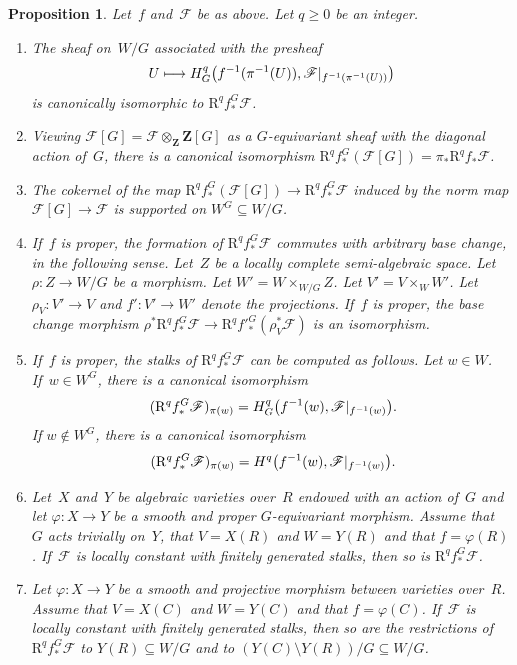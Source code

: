 \documentclass[JEP,XML,SOM,Unicode]{cedram}
\newcommand\mto{\mathchoice{\longmapsto}{\mapsto}{\mapsto}{\mapsto}}
\theoremstyle{plain}
\newtheorem{prop}[thm]{Proposition}
\theoremstyle{definition}
\numberwithin{equation}{section}
\newcommand{\sF}{{\mathscr F}}
\newcommand{\Z}{{\mathbf Z}}
\renewcommand{\phi}{\varphi}
\newcommand{\RR}{{\mathrm{R}}}
\begin{document}
\begin{prop}
\label{prop:joli leray general properties}
Let~$f$ and~$\sF$ be as above. Let $q\geq 0$ be an integer.
\begin{enumerate}
\item\label{prop:joli}
The sheaf on~$W/G$ associated with the presheaf
\[
U \mto H^q_G\big(f^{-1}(\pi^{-1}(U)),\sF|_{f^{-1}(\pi^{-1}(U))}\big)
\]
is canonically isomorphic to $\RR^qf^G_*\sF$.

\item\label{prop:jolii}
Viewing $\sF[G]=\sF \otimes_\Z \Z[G]$ as a $G$\nobreakdash-equivariant sheaf
with the diagonal action of~$G$, there is a canonical isomorphism
$\RR^qf^G_*(\sF[G])=\pi_*\RR^qf_*\sF$.

\item\label{prop:joliii}
The cokernel of the map
$\RR^qf^G_*(\sF[G]) \to \RR^qf^G_*\sF$ induced by the norm map $\sF[G]\to \sF$
is supported on $W^G \subseteq W/G$.

\item\label{prop:joliv}
If~$f$ is proper, the formation of $\RR^qf^G_*\sF$ commutes with arbitrary base change, in the following sense.
Let~$Z$ be a locally complete semi-algebraic space.
Let $\rho:Z \to W/G$ be a morphism.
Let $W' = W \times_{W/G} Z$.
Let $V' = V \times_W W'$.
Let $\rho_V:V'\to V$ and $f':V'\to W'$ denote the projections.
If~$f$ is proper, the base change morphism
$\rho^*\RR^qf^G_*\sF\to \RR^qf'^G_*(\rho_V^*\sF)$
is an isomorphism.

\item\label{prop:jolv}
If~$f$ is proper, the stalks of $\RR^qf^G_*\sF$ can be computed as follows.
Let $w \in W$.
If~$w \in W^G$, there is a canonical isomorphism
\[
(\RR^qf^G_*\sF)_{\pi(w)} = H^q_G\big(f^{-1}(w),\sF|_{f^{-1}(w)}\big)\rlap{.}
\]
If $w \notin W^G$, there is a canonical isomorphism
\[
(\RR^qf^G_*\sF)_{\pi(w)} = H^q\big(f^{-1}(w),\sF|_{f^{-1}(w)}\big)\rlap{.}
\]

\item\label{prop:jolvi}
Let~$X$ and~$Y$ be algebraic varieties over~$R$ endowed with an action of~$G$
and let $\phi:X\to Y$ be a smooth and proper $G$\nobreakdash-equivariant
morphism.
Assume that~$G$ acts trivially on~$Y$,
that $V=X(R)$ and $W=Y(R)$
and that $f=\phi(R)$.
If~$\sF$ is locally constant with finitely generated stalks,
then so is $\RR^qf^G_*\sF$.

\item\label{prop:jolvii}
Let $\phi:X\to Y$ be a smooth and projective morphism
between varieties over~$R$.
Assume that $V=X(C)$ and $W=Y(C)$ and that $f=\phi(C)$.
If~$\sF$ is locally constant with finitely generated stalks,
then so are the restrictions of $\RR^qf^G_*\sF$
to $Y(R) \subseteq W/G$ and to $(Y(C)\setminus Y(R))/G \subseteq W/G$.
\end{enumerate}
\end{prop}
\end{document}
